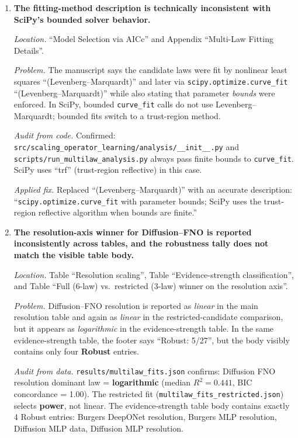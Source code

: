 \documentclass[11pt]{article}
\begin{document}
\begin{enumerate}
\item \textbf{The fitting-method description is technically inconsistent with SciPy's bounded solver behavior.}

\emph{Location.} ``Model Selection via AICc'' and Appendix ``Multi-Law Fitting Details''.

\emph{Problem.} The manuscript says the candidate laws were fit by nonlinear least squares ``(Levenberg--Marquardt)'' and later via \texttt{scipy.optimize.curve\_fit} ``(Levenberg--Marquardt)'' while also stating that parameter \emph{bounds} were enforced. In SciPy, bounded \texttt{curve\_fit} calls do not use Levenberg--Marquardt; bounded fits switch to a trust-region method.

\emph{Audit from code.} Confirmed: \texttt{src/scaling\_operator\_learning/analysis/\_\_init\_\_.py} and \texttt{scripts/run\_multilaw\_analysis.py} always pass finite bounds to \texttt{curve\_fit}. SciPy uses ``trf'' (trust-region reflective) in this case.

\emph{Applied fix.} Replaced ``(Levenberg--Marquardt)'' with an accurate description: ``\texttt{scipy.optimize.curve\_fit} with parameter bounds; SciPy uses the trust-region reflective algorithm when bounds are finite.''

\item \textbf{The resolution-axis winner for Diffusion--FNO is reported inconsistently across tables, and the robustness tally does not match the visible table body.}

\emph{Location.} Table ``Resolution scaling'', Table ``Evidence-strength classification'', and Table ``Full (6-law) vs.\ restricted (3-law) winner on the resolution axis''.

\emph{Problem.} Diffusion--FNO resolution is reported as \emph{linear} in the main resolution table and again as \emph{linear} in the restricted-candidate comparison, but it appears as \emph{logarithmic} in the evidence-strength table. In the same evidence-strength table, the footer says ``Robust: 5/27'', but the body visibly contains only four \textbf{Robust} entries.

\emph{Audit from data.} \texttt{results/multilaw\_fits.json} confirms: Diffusion FNO resolution dominant law = \textbf{logarithmic} (median $R^2 = 0.441$, BIC concordance = 1.00). The restricted fit (\texttt{multilaw\_fits\_restricted.json}) selects \textbf{power}, not linear. The evidence-strength table body contains exactly 4 Robust entries: Burgers DeepONet resolution, Burgers MLP resolution, Diffusion MLP data, Diffusion MLP resolution.


\end{enumerate}
\end{document}
